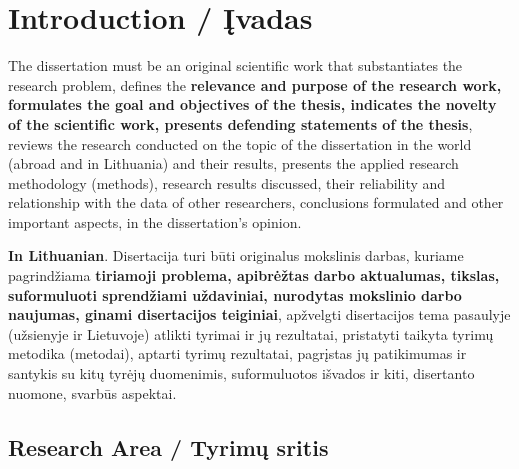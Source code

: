     

\chapter*{Introduction / Įvadas}
\label{cha:intro_lt}

The dissertation must be an original scientific work that substantiates the research problem, defines the \textbf{relevance and purpose of the research work, formulates the goal and objectives of the thesis, indicates the novelty of the scientific work, presents defending statements of the thesis}, reviews the research conducted on the topic of the dissertation in the world (abroad and in Lithuania) and their results, presents the applied research methodology (methods), research results discussed, their reliability and relationship with the data of other researchers, conclusions formulated and other important aspects, in the dissertation's opinion.


\textbf{In Lithuanian}. Disertacija turi būti originalus mokslinis darbas, kuriame pagrindžiama \textbf{tiriamoji problema, apibrėžtas darbo aktualumas, tikslas, suformuluoti sprendžiami uždaviniai, nurodytas mokslinio darbo naujumas, ginami disertacijos teiginiai}, apžvelgti disertacijos tema pasaulyje (užsienyje ir Lietuvoje) atlikti tyrimai ir jų rezultatai, pristatyti taikyta tyrimų metodika (metodai), aptarti tyrimų rezultatai, pagrįstas jų patikimumas ir santykis su kitų tyrėjų duomenimis, suformuluotos išvados ir kiti, disertanto nuomone, svarbūs aspektai.


\section*{Research Area / Tyrimų sritis}

